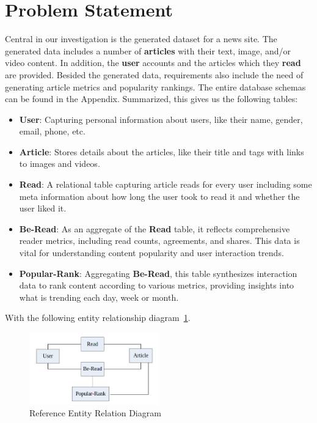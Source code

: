 \documentclass{report}
\begin{document}
    \section{Problem Statement}
    Central in our investigation is the generated dataset for a news site. The generated data includes a number of \textbf{articles} with their text, image, and/or video content. In addition, the \textbf{user} accounts and the articles which they \textbf{read} are provided. Besided the generated data, requirements also include the need of generating article metrics and popularity rankings. The entire database schemas can be found in the Appendix.
    Summarized, this gives us the following tables:

    \begin{itemize}
        \item \textbf{User}: Capturing personal information about users, like their name, gender, email, phone, etc.
        \item \textbf{Article}: Stores details about the articles, like their title and tags with links to images and videos.
        \item \textbf{Read}: A relational table capturing article reads for every user including some meta information about how long the user took to read it and whether the user liked it.
        \item \textbf{Be-Read}: As an aggregate of the \textbf{Read} table, it reflects comprehensive reader metrics, including read counts, agreements, and shares. This data is vital for understanding content popularity and user interaction trends.
        \item \textbf{Popular-Rank}: Aggregating \textbf{Be-Read}, this table synthesizes interaction data to rank content according to various metrics, providing insights into what is trending each day, week or month.
    \end{itemize}

    With the following entity relationship diagram~\ref{fig:reference-entity-relation-diagram}.

    \begin{figure}[h]
        \centering
        \includegraphics[width=0.5\textwidth]{images/reference-entity-relation-diagram}
        \caption{Reference Entity Relation Diagram}
        \label{fig:reference-entity-relation-diagram}
    \end{figure}
\end{document}
